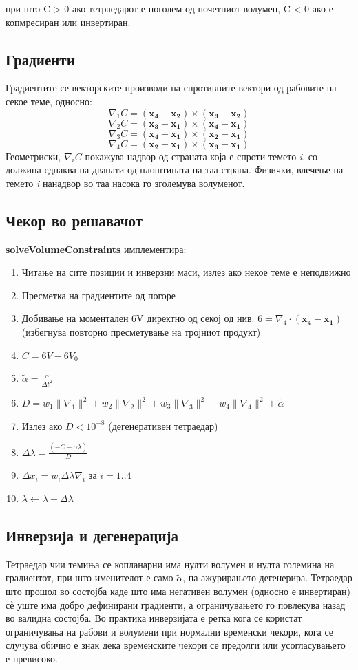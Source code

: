 при што C > 0 ако тетраедарот е поголем од почетниот волумен, C < 0 ако е копмресиран или инвертиран.

\subsection{Градиенти}
Градиентите се векторските производи на спротивните вектори од рабовите на секое теме, односно:
$$\nabla_1 C = \mathbf{(x_4 - x_2) \times (x_3 - x_2)}  $$
$$\nabla_2 C = \mathbf{(x_3 - x_1) \times (x_4 - x_1)}  $$
$$\nabla_3 C = \mathbf{(x_4 - x_1) \times (x_2 - x_1)}  $$
$$\nabla_4 C = \mathbf{(x_2 - x_1) \times (x_3 - x_1)}  $$
Геометриски, $\nabla_i C$ покажува надвор од страната која е спроти темето \textit{i}, со должина еднаква на двапати од плоштината на таа страна. Физички, влечење на темето \textit{i} нанадвор во таа насока го зголемува волуменот.

\subsection{Чекор во решавачот}
\textbf{solveVolumeConstraints} имплементира:
\begin{enumerate}
	\item Читање на сите позиции и инверзни маси, излез ако некое теме е неподвижно
	\item Пресметка на градиентите од погоре
	\item Добивање на моментален 6V директно од секој од нив: $6 = \nabla_4 \cdot(\mathbf{x_4 - x_1}) $(избегнува повторно пресметување на тројниот продукт)
	\item $C = 6V - 6V_0$
	\item $\tilde{\alpha} = \frac{\alpha}{\Delta t^2}$
	\item $D =  w_1 \lVert \nabla_1 \rVert^2 + w_2\lVert \nabla_2\rVert^2 + w_3\lVert\nabla_3\rVert^2 + w_4\lVert\nabla_4\rVert^2 + \tilde{\alpha}$
	\item Излез ако $D<10^{-8}$ (дегенеративен тетраедар)
	\item $\Delta \lambda = \frac{(-C -\tilde{\alpha}\lambda)}{D}$
	\item $\Delta x_i = w_i \Delta \lambda \nabla_i $ за $i = 1..4$
	\item $\lambda \leftarrow \lambda + \Delta \lambda$
\end{enumerate}

\subsection{Инверзија и дегенерација}
Тетраедар чии темиња се копланарни има нулти волумен и нулта големина на градиентот, при што именителот е само  $\tilde{\alpha}$, па ажурирањето дегенерира. Тетраедар што прошол во состојба каде што има негативен волумен (односно е инвертиран)  сѐ уште има добро дефинирани градиенти, а ограничувањето го повлекува назад во валидна состојба. Во практика инверзијата е ретка кога се користат ограничувања на рабови и волумени при нормални временски чекори, кога се случува обично е знак дека временските чекори се предолги или усогласувањето е превисоко.


